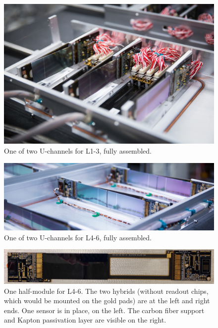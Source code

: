 \begin{figure}[ht]
    \includegraphics[width=\textwidth]{detector/figs/l123}
    \caption{One of two U-channels for L1-3, fully assembled.}
    \label{figure:svt_layout}
\end{figure}

\begin{figure}[ht]
    \includegraphics[width=\textwidth]{detector/figs/l456}
    \caption{One of two U-channels for L4-6, fully assembled.}
    \label{figure:svt_layout}
\end{figure}

\begin{figure}[ht]
    \includegraphics[width=\textwidth]{detector/figs/l456_hm}
    \caption{One half-module for L4-6. The two hybrids (without readout chips, which would be mounted on the gold pads) are at the left and right ends. One sensor is in place, on the left. The carbon fiber support and Kapton passivation layer are visible on the right.}
    \label{figure:svt_layout}
\end{figure}

